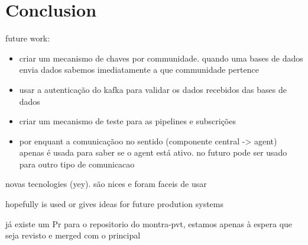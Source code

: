 \chapter{Conclusion}

future work:
\begin{itemize}
    \item criar um mecanismo de chaves por communidade. quando uma bases de dados envia dados sabemos imediatamente a que communidade pertence
    \item usar a autenticação do kafka para validar os dados recebidos das bases de dados
    \item criar um mecanismo de teste para as pipelines e subscrições
    \item por enquant a comunicaçãoo no sentido (componente central -> agent) apenas é usada para saber se o agent está ativo. no futuro pode ser usado para outro tipo de comunicacao
\end{itemize}

novas tecnologies (yey). são nices e foram faceis de usar

hopefully is used or gives ideas for future prodution systems

já existe um Pr para o repositorio do montra-pvt, estamos apenas à espera que seja revisto e merged com o principal
